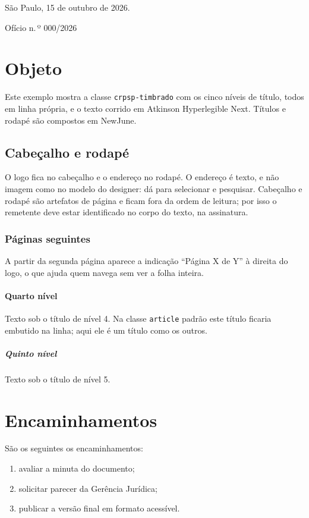 \documentclass{crpsp-timbrado}
\begin{document}
\noindent São Paulo, 15 de outubro de 2026.

\bigskip
\noindent Ofício n.\,º 000/2026

\section{Objeto}

Este exemplo mostra a classe \texttt{crpsp-timbrado} com os cinco níveis de
título, todos em linha própria, e o texto corrido em Atkinson Hyperlegible Next.
Títulos e rodapé são compostos em NewJune.

\subsection{Cabeçalho e rodapé}

O logo fica no cabeçalho e o endereço no rodapé. O endereço é texto, e não
imagem como no modelo do designer: dá para selecionar e pesquisar. Cabeçalho e
rodapé são artefatos de página e ficam fora da ordem de leitura; por isso o
remetente deve estar identificado no corpo do texto, na assinatura.

\subsubsection{Páginas seguintes}

A partir da segunda página aparece a indicação “Página X de Y” à direita do
logo, o que ajuda quem navega sem ver a folha inteira.

\paragraph{Quarto nível}

Texto sob o título de nível 4. Na classe \texttt{article} padrão este título
ficaria embutido na linha; aqui ele é um título como os outros.

\subparagraph{Quinto nível}

Texto sob o título de nível 5.

\section{Encaminhamentos}

São os seguintes os encaminhamentos:

\begin{enumerate}
  \item avaliar a minuta do documento;
  \item solicitar parecer da Gerência Jurídica;
  \item publicar a versão final em formato acessível.
\end{enumerate}
\end{document}

